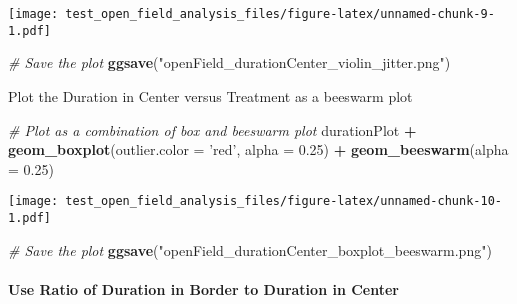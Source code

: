 \documentclass[]{article}
\newenvironment{Shaded}{\begin{snugshade}}{\end{snugshade}}
\newcommand{\KeywordTok}[1]{\textcolor[rgb]{0.13,0.29,0.53}{\textbf{#1}}}
\newcommand{\DataTypeTok}[1]{\textcolor[rgb]{0.13,0.29,0.53}{#1}}
\newcommand{\FloatTok}[1]{\textcolor[rgb]{0.00,0.00,0.81}{#1}}
\newcommand{\StringTok}[1]{\textcolor[rgb]{0.31,0.60,0.02}{#1}}
\newcommand{\CommentTok}[1]{\textcolor[rgb]{0.56,0.35,0.01}{\textit{#1}}}
\newcommand{\OperatorTok}[1]{\textcolor[rgb]{0.81,0.36,0.00}{\textbf{#1}}}
\newcommand{\NormalTok}[1]{#1}
\let\oldparagraph\paragraph
\renewcommand{\paragraph}[1]{\oldparagraph{#1}\mbox{}}
\begin{document}
\texttt{[image: test\_open\_field\_analysis\_files/figure-latex/unnamed-chunk-9-1.pdf]}

\begin{Shaded}
\begin{Highlighting}[]
\CommentTok{# Save the plot}
\KeywordTok{ggsave}\NormalTok{(}\StringTok{"openField_durationCenter_violin_jitter.png"}\NormalTok{)}
\end{Highlighting}
\end{Shaded}

Plot the Duration in Center versus Treatment as a beeswarm plot

\begin{Shaded}
\begin{Highlighting}[]
\CommentTok{# Plot as a combination of box and beeswarm plot}
\NormalTok{durationPlot }\OperatorTok{+}\StringTok{ }\KeywordTok{geom_boxplot}\NormalTok{(}\DataTypeTok{outlier.color =} \StringTok{'red'}\NormalTok{, }\DataTypeTok{alpha =} \FloatTok{0.25}\NormalTok{) }\OperatorTok{+}
\StringTok{    }\KeywordTok{geom_beeswarm}\NormalTok{(}\DataTypeTok{alpha =} \FloatTok{0.25}\NormalTok{)}
\end{Highlighting}
\end{Shaded}

\texttt{[image: test\_open\_field\_analysis\_files/figure-latex/unnamed-chunk-10-1.pdf]}

\begin{Shaded}
\begin{Highlighting}[]
\CommentTok{# Save the plot}
\KeywordTok{ggsave}\NormalTok{(}\StringTok{"openField_durationCenter_boxplot_beeswarm.png"}\NormalTok{)}
\end{Highlighting}
\end{Shaded}

\paragraph{Use Ratio of Duration in Border to Duration in
Center}\label{use-ratio-of-duration-in-border-to-duration-in-center}
\end{document}
